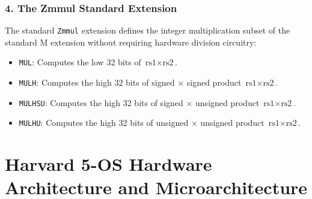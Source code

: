 \subsubsection{4. The Zmmul Standard Extension}
The standard \texttt{Zmmul} extension defines the integer multiplication subset of the standard M extension without requiring hardware division circuitry:
\begin{itemize}
    \item \texttt{MUL}: Computes the low 32 bits of $\text{rs1} \times \text{rs2}$.
    \item \texttt{MULH}: Computes the high 32 bits of signed $\times$ signed product $\text{rs1} \times \text{rs2}$.
    \item \texttt{MULHSU}: Computes the high 32 bits of signed $\times$ unsigned product $\text{rs1} \times \text{rs2}$.
    \item \texttt{MULHU}: Computes the high 32 bits of unsigned $\times$ unsigned product $\text{rs1} \times \text{rs2}$.
\end{itemize}


\section{Harvard 5-OS Hardware Architecture and Microarchitecture}\label{riscvArch}

